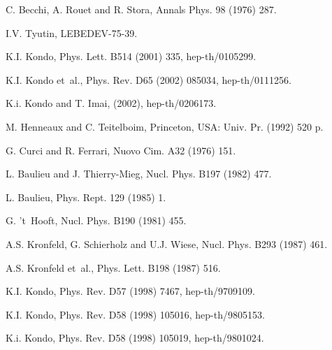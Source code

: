 \documentclass[a4paper,a4paper]{article}
\begin{document}
\begin{thebibliography}{10}
C. Becchi, A. Rouet and R. Stora,
\newblock Annals Phys. 98 (1976) 287.

I.V. Tyutin,
\newblock LEBEDEV-75-39.

K.I. Kondo,
\newblock Phys. Lett. B514 (2001) 335, hep-th/0105299.

K.I. Kondo et~al.,
\newblock Phys. Rev. D65 (2002) 085034, hep-th/0111256.

K.i. Kondo and T. Imai,
\newblock (2002), hep-th/0206173.

M. Henneaux and C. Teitelboim,
\newblock Princeton, USA: Univ. Pr. (1992) 520 p.

G. Curci and R. Ferrari,
\newblock Nuovo Cim. A32 (1976) 151.

L. Baulieu and J. Thierry-Mieg,
\newblock Nucl. Phys. B197 (1982) 477.

L. Baulieu,
\newblock Phys. Rept. 129 (1985) 1.

G. 't~Hooft,
\newblock Nucl. Phys. B190 (1981) 455.

A.S. Kronfeld, G. Schierholz and U.J. Wiese,
\newblock Nucl. Phys. B293 (1987) 461.

A.S. Kronfeld et~al.,
\newblock Phys. Lett. B198 (1987) 516.

K.I. Kondo,
\newblock Phys. Rev. D57 (1998) 7467, hep-th/9709109.

K.I. Kondo,
\newblock Phys. Rev. D58 (1998) 105016, hep-th/9805153.

K.i. Kondo,
\newblock Phys. Rev. D58 (1998) 105019, hep-th/9801024.

\end{thebibliography}
\end{document}
